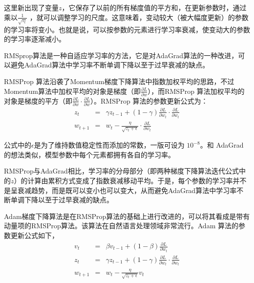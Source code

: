 \parinterval  这里新出现了变量$ z $，它保存了以前的所有梯度值的平方和，在更新参数时，通过乘以$ \frac{1}{\sqrt{z_t}} $ ，就可以调整学习的尺度。这意味着，变动较大（被大幅度更新）的参数的学习率将变小。也就是说，可以按参数的元素进行学习率衰减，使变动大的参数的学习率逐渐减小。

%

\vspace{0.5em}
\vspace{0.5em}

\parinterval  RMSprop算法是一种自适应学习率的方法\cite{tieleman2012rmsprop}，它是对AdaGrad算法的一种改进，可以避免AdaGrad算法中学习率不断单调下降以至于过早衰减的缺点。

\parinterval  RMSProp 算法沿袭了Momentum梯度下降算法中指数加权平均的思路，不过Momentum算法中加权平均的对象是梯度（即$ \frac{\partial L}{\partial w}$），而RMSProp 算法加权平均的对象是梯度的平方（即$ \frac{\partial L}{\partial w} \cdot  \frac{\partial L}{\partial w} $）。RMSProp 算法的参数更新公式为：
\begin{eqnarray}
z_t&=&\gamma z_{t-1}+(1-\gamma) \frac{\partial L}{\partial w_t} \cdot  \frac{\partial L}{\partial w_t}\label{eq:5-38}\\
w_{t+1}&=&w_t-\frac{\eta}{\sqrt{z_t+\epsilon}}\cdot \frac{\partial L}{\partial w_t}
\label{eq:5-39}
\end{eqnarray}

\parinterval  公式中的$ \epsilon $是为了维持数值稳定性而添加的常数，一版可设为 $ 10^{-8} $。和 AdaGrad 的想法类似，模型参数中每个元素都拥有各自的学习率。

\parinterval  RMSProp与AdaGrad相比，学习率的分母部分（即两种梯度下降算法迭代公式中的$ z $）的计算由累积方式变成了指数衰减移动平均。于是，每个参数的学习率并不是呈衰减趋势，而是既可以变小也可以变大，从而避免AdaGrad算法中学习率不断单调下降以至于过早衰减的缺点。

%

\vspace{0.5em}
\vspace{0.5em}

\parinterval  Adam梯度下降算法是在RMSProp算法的基础上进行改进的，可以将其看成是带有动量项的RMSProp算法\cite{kingma2014adam}。该算法在自然语言处理领域非常流行。Adam 算法的参数更新公式如下，
\begin{eqnarray}
v_t&=&\beta v_{t-1}+(1-\beta)\frac{\partial L}{\partial w_t}\label{eq:5-40}\\
z_t&=&\gamma z_{t-1}+(1-\gamma) \frac{\partial L}{\partial w_t} \cdot  \frac{\partial L}{\partial w_t}\label{eq:5-41}\\
w_{t+1}&=&w_t-\frac{\eta}{\sqrt{z_t+\epsilon}} v_t
\label{eq:5-42}
\end{eqnarray}

